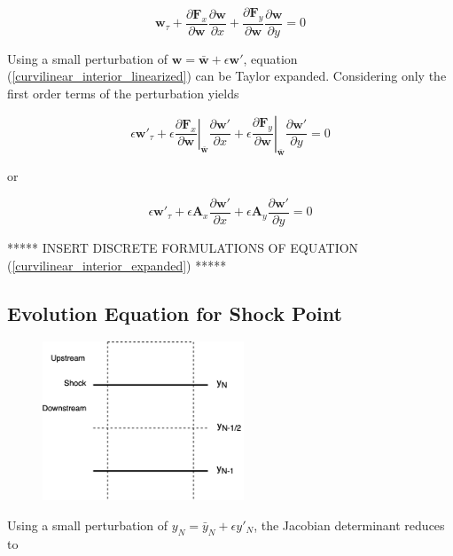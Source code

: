 \documentclass[10pt]{article}
\begin{document}
	\begin{equation} \label{curvilinear_interior_linearized}
	\mathbf{w}_\tau  + \frac{\partial \mathbf{F}_x}{\partial \mathbf{w}} \frac{\partial \mathbf{w}}{\partial x}+ \frac{\partial \mathbf{F}_y}{\partial \mathbf{w}} \frac{\partial \mathbf{w}}{\partial y} = 0
	\end{equation}

	Using a small perturbation of $\mathbf{w} = \bar{\mathbf{w}} + \epsilon \mathbf{w}'$, equation (\ref{curvilinear_interior_linearized}) can be Taylor expanded. Considering only the first order terms of the perturbation yields
	
	$$ \epsilon \mathbf{w}'_\tau  + \epsilon \left. \frac{\partial \mathbf{F}_x}{\partial \mathbf{w}} \right|_{\bar{\mathbf{w}}} \frac{\partial \mathbf{w}'}{\partial x} + \epsilon \left. \frac{\partial \mathbf{F}_y}{\partial \mathbf{w}} \right|_{\bar{\mathbf{w}}} \frac{\partial \mathbf{w}'}{\partial y} = 0 $$
	
	or
	
	\begin{equation} \label{curvilinear_interior_expanded}
		\epsilon \mathbf{w}'_\tau  + \epsilon \mathbf{A}_x \frac{\partial \mathbf{w}'}{\partial x} + \epsilon \mathbf{A}_y \frac{\partial \mathbf{w}'}{\partial y} = 0
	\end{equation}
	
	***** INSERT DISCRETE FORMULATIONS OF EQUATION (\ref{curvilinear_interior_expanded}) *****
	
	\subsection{Evolution Equation for Shock Point}
	
	\begin{figure}[h]
		\includegraphics[width=6cm]{shock_point_y}
		\centering
	\end{figure}
	
	Using a small perturbation of $y_N = \bar{y}_N + \epsilon y'_N$, the Jacobian determinant reduces to
	
\end{document}
